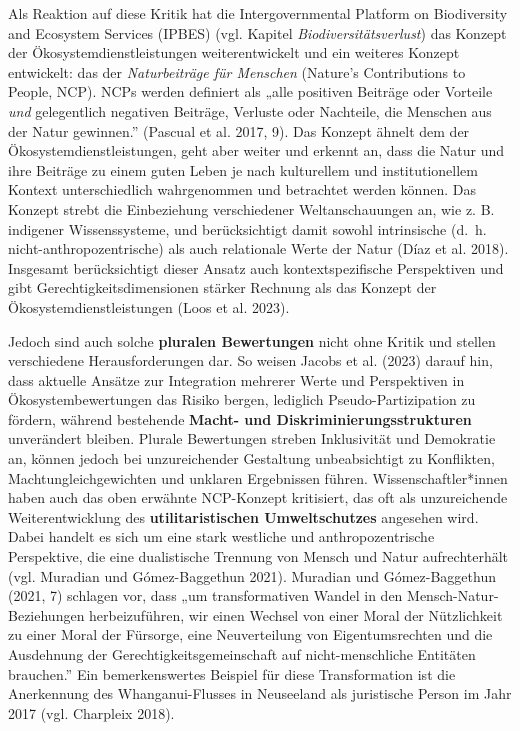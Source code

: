 \documentclass[
  nswissgerman,
  a4paper,
  DIV=11,
  numbers=noendperiod,
  oneside,
  openany]{scrreprt}
\begin{document}
Als Reaktion auf diese Kritik hat die Intergovernmental Platform on
Biodiversity and Ecosystem Services (IPBES) (vgl. Kapitel
\emph{Biodiversitätsverlust}) das Konzept der Ökosystemdienstleistungen
weiterentwickelt und ein weiteres Konzept entwickelt: das der
\emph{Naturbeiträge für Menschen} (Nature's Contributions to People,
NCP). NCPs werden definiert als „alle positiven Beiträge oder Vorteile
\emph{und} gelegentlich negativen Beiträge, Verluste oder Nachteile, die
Menschen aus der Natur gewinnen.'' ({Pascual et al.} 2017, 9). Das
Konzept ähnelt dem der Ökosystemdienstleistungen, geht aber weiter und
erkennt an, dass die Natur und ihre Beiträge zu einem guten Leben je
nach kulturellem und institutionellem Kontext unterschiedlich
wahrgenommen und betrachtet werden können. Das Konzept strebt die
Einbeziehung verschiedener Weltanschauungen an, wie z. B. indigener
Wissenssysteme, und berücksichtigt damit sowohl intrinsische (d.~h.
nicht-anthropozentrische) als auch relationale Werte der Natur ({Díaz et
al.} 2018). Insgesamt berücksichtigt dieser Ansatz auch
kontextspezifische Perspektiven und gibt Gerechtigkeitsdimensionen
stärker Rechnung als das Konzept der Ökosystemdienstleistungen (Loos et
al. 2023).

Jedoch sind auch solche \textbf{pluralen Bewertungen} nicht ohne Kritik
und stellen verschiedene Herausforderungen dar. So weisen Jacobs et al.
(2023) darauf hin, dass aktuelle Ansätze zur Integration mehrerer Werte
und Perspektiven in Ökosystembewertungen das Risiko bergen, lediglich
Pseudo-Partizipation zu fördern, während bestehende \textbf{Macht- und
Diskriminierungsstrukturen} unverändert bleiben. Plurale Bewertungen
streben Inklusivität und Demokratie an, können jedoch bei unzureichender
Gestaltung unbeabsichtigt zu Konflikten, Machtungleichgewichten und
unklaren Ergebnissen führen. Wissenschaftler*innen haben auch das oben
erwähnte NCP-Konzept kritisiert, das oft als unzureichende
Weiterentwicklung des \textbf{utilitaristischen Umweltschutzes}
angesehen wird. Dabei handelt es sich um eine stark westliche und
anthropozentrische Perspektive, die eine dualistische Trennung von
Mensch und Natur aufrechterhält (vgl. Muradian und Gómez-Baggethun
2021). Muradian und Gómez-Baggethun (2021, 7) schlagen vor, dass „um
transformativen Wandel in den Mensch-Natur-Beziehungen herbeizuführen,
wir einen Wechsel von einer Moral der Nützlichkeit zu einer Moral der
Fürsorge, eine Neuverteilung von Eigentumsrechten und die Ausdehnung der
Gerechtigkeitsgemeinschaft auf nicht-menschliche Entitäten brauchen.''
Ein bemerkenswertes Beispiel für diese Transformation ist die
Anerkennung des Whanganui-Flusses in Neuseeland als juristische Person
im Jahr 2017 (vgl. Charpleix 2018).
\end{document}
